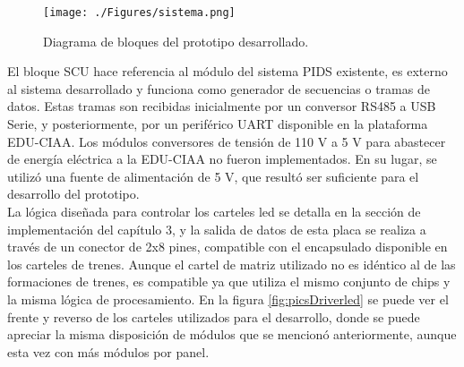\begin{figure}[H]
	\centering
	\texttt{[image: ./Figures/sistema.png]}
	\caption{Diagrama de bloques del prototipo desarrollado.}
	\label{fig:sistema}
\end{figure}

El bloque SCU hace referencia al módulo del sistema PIDS existente, es externo al sistema desarrollado y funciona como generador de secuencias o tramas de datos. Estas tramas son recibidas inicialmente por un conversor RS485 a USB Serie, y posteriormente, por un periférico UART disponible en la plataforma EDU-CIAA. Los módulos conversores de tensión de 110 V a 5 V para abastecer de energía eléctrica a la EDU-CIAA no fueron implementados. En su lugar, se utilizó una fuente de alimentación de 5 V, que resultó ser suficiente para el desarrollo del prototipo. \\

La lógica diseñada para controlar los carteles led se detalla en la sección de implementación del capítulo 3, y la salida de datos de esta placa se realiza a través de un conector de 2x8 pines, compatible con el encapsulado disponible en los carteles de trenes. Aunque el cartel de matriz utilizado no es idéntico al de las formaciones de trenes, es compatible ya que utiliza el mismo conjunto de chips y la misma lógica de procesamiento. En la figura \ref{fig:picsDriverled} se puede ver el frente y reverso de los carteles utilizados para el desarrollo, donde se puede apreciar la misma disposición de módulos que se mencionó anteriormente, aunque esta vez con más módulos por panel. \\


